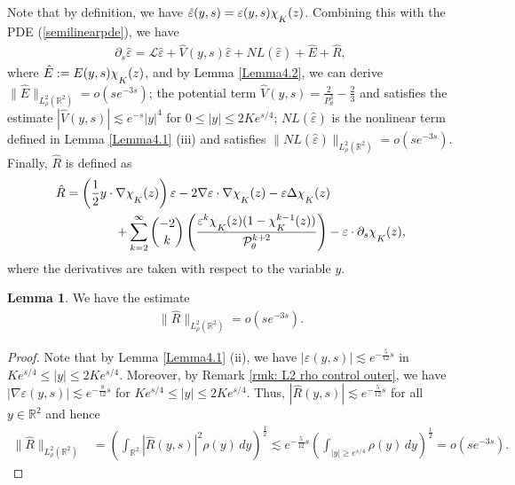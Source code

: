\documentclass[11pt,reqno]{amsart}
\theoremstyle{definition}
\theoremstyle{bfremark}
\newtheorem{lemma}{Lemma}[section]
\numberwithin{equation}{section}
\newcommand{\veph}{\hat\varepsilon }
\newcommand{\mchi}{\raisebox{0pt}[1ex][1ex]{$\chi$}}
\begin{document}
Note that by definition, we have 
\(\veph(y,s)=\varepsilon(y,s) \mchi_{K}(z)\). Combining this with the PDE (\ref{semilinearpde}), we have
\begin{align}
    \partial_s\veph=\mathcal{L}\veph+\hat{V}(y,s)\veph+NL(\veph)+\hat{E}+\hat{R},\label{innerpde}
\end{align}
where \(\hat{E}:=E(y,s)\mchi_K(z)\), and by Lemma \ref{Lemma4.2}, we can derive \(\|\hat{E}\|_{L^2_{\rho}(\mathbb{R}^2)}=o(se^{-3s})\); the potential term \(\hat{V}(y,s)=\frac{2}{P_{\theta}^3}-\frac{2}{3}\) and satisfies the estimate \(|\hat{V}(y,s)| \lesssim e^{-s}|y|^4\) for \(0 \leq |y| \leq 2Ke^{s/4}\); \(NL(\veph)\) is the nonlinear term defined in Lemma \ref{Lemma4.1} (iii) and satisfies \(\|NL(\veph)\|_{L^2_{\rho}(\mathbb{R}^2)}=o(se^{-3s})\). Finally, 
\(\hat{R}\) is defined as 
\begin{align}
    \hat{R}&=\left(\frac{1}{2}y \cdot \nabla \mchi_K(z)\right) \varepsilon-2 \nabla \varepsilon \cdot \nabla \mchi_K(z) -\varepsilon \Delta \mchi_K(z) \nonumber \\
    & \qquad \qquad + \sum_{k=2}^{\infty}\binom{-2}{k}\left(\frac{\varepsilon^k\mchi_K(z)(1-\mchi_K^{k-1}(z))}{\mathcal{P}_{\theta}^{k+2}}\right)-\varepsilon \cdot \partial_s\mchi_K(z), \label{eq:hatR}
\end{align}
where the derivatives are taken with respect to the variable \(y\).
\begin{lemma}
\label{lem:estimR}
    We have the estimate
    \begin{align*}
        \|\hat{R}\|_{L^2_{\rho}(\mathbb{R}^2)}=o(se^{-3s}).
    \end{align*}
\end{lemma}
\begin{proof}
    Note that by Lemma \ref{Lemma4.1} (ii), we have \(|\varepsilon(y,s)| \lesssim e^{-\frac{5}{12}s}\) in \(Ke^{s/4} \leq |y| \leq 2Ke^{s/4}\). Moreover, by Remark \ref{rmk: L2 rho control outer}, we have \(|\nabla\varepsilon(y,s)| \lesssim e^{-\frac{8}{12}s}\) for \(Ke^{s/4} \leq |y
    |\leq 2Ke^{s/4}\). Thus,  
    \(|\hat{R}(y,s)| \lesssim e^{-\frac{5}{12}s}\) for all \(y \in \mathbb{R}^2\) and hence
    \begin{align*}
        \|\hat{R}\|_{L^2_{\rho}(\mathbb{R}^2)}&=\left(\int_{\mathbb{R}^2}|\hat{R}(y,s)|^2\rho(y)\,dy\right)^{\frac{1}{2}} \lesssim e^{-\frac{5}{12}s}\left( \int_{|y| \geq e^{s/4}}\rho(y)\,dy\right)^{\frac{1}{2}} = o(se^{-3s}).
    \end{align*}
\end{proof}
\end{document}
